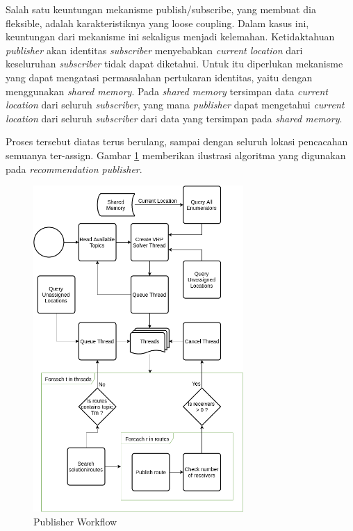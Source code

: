 \documentclass[conference]{IEEEtran}
\begin{document}
Salah satu keuntungan mekanisme publish/subscribe, yang membuat dia fleksible, adalah karakteristiknya yang loose coupling. Dalam kasus ini, keuntungan dari mekanisme ini sekaligus menjadi kelemahan. Ketidaktahuan \textit{publisher} akan identitas \textit{subscriber} menyebabkan \textit{current location} dari keseluruhan \textit{subscriber} tidak dapat diketahui. Untuk itu diperlukan mekanisme yang dapat mengatasi permasalahan pertukaran identitas, yaitu dengan menggunakan \textit{shared memory}. Pada \textit{shared memory} tersimpan data \textit{current location} dari seluruh \textit{subscriber}, yang mana \textit{publisher} dapat mengetahui \textit{current location} dari seluruh \textit{subscriber} dari data yang tersimpan pada \textit{shared memory}.


Proses tersebut diatas terus berulang, sampai dengan seluruh lokasi pencacahan semuanya ter-assign. Gambar \ref{fig:publisher-algorithm} memberikan ilustrasi algoritma yang digunakan pada \textit{recommendation publisher}.


\begin{figure}[h]
	\centering
	\includegraphics[width=8cm]{Resources/Images/publisher-algorithm}
	\caption{Publisher Workflow}
	\label{fig:publisher-algorithm}
\end{figure} 


\end{document}
